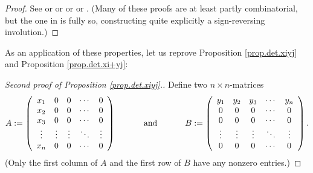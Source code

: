 \begin{proof}
See \cite[Theorem B.17]{Strick13} or \cite[Theorem 6.23]{detnotes} or
\cite[\S 5]{Zeilbe} or \cite[Lemma 4.7.5 (1)]{Ford21} or \cite[Theorem
5.7]{Laue-det}. (Many of these proofs are at least partly combinatorial, but
the one in \cite[\S 5]{Zeilbe} is fully so, constructing quite explicitly a
sign-reversing involution.)
\end{proof}

As an application of these properties, let us reprove Proposition
\ref{prop.det.xiyj} and Proposition \ref{prop.det.xi+yj}:

\begin{proof}
[Second proof of Proposition \ref{prop.det.xiyj}.]Define two $n\times
n$-matrices%
\[
A:=\left(
\begin{array}
[c]{ccccc}%
x_{1} & 0 & 0 & \cdots & 0\\
x_{2} & 0 & 0 & \cdots & 0\\
x_{3} & 0 & 0 & \cdots & 0\\
\vdots & \vdots & \vdots & \ddots & \vdots\\
x_{n} & 0 & 0 & \cdots & 0
\end{array}
\right)  \ \ \ \ \ \ \ \ \ \ \text{and}\ \ \ \ \ \ \ \ \ \ B:=\left(
\begin{array}
[c]{ccccc}%
y_{1} & y_{2} & y_{3} & \cdots & y_{n}\\
0 & 0 & 0 & \cdots & 0\\
0 & 0 & 0 & \cdots & 0\\
\vdots & \vdots & \vdots & \ddots & \vdots\\
0 & 0 & 0 & \cdots & 0
\end{array}
\right)  .
\]
(Only the first column of $A$ and the first row of $B$ have any nonzero entries.)


\end{proof}
